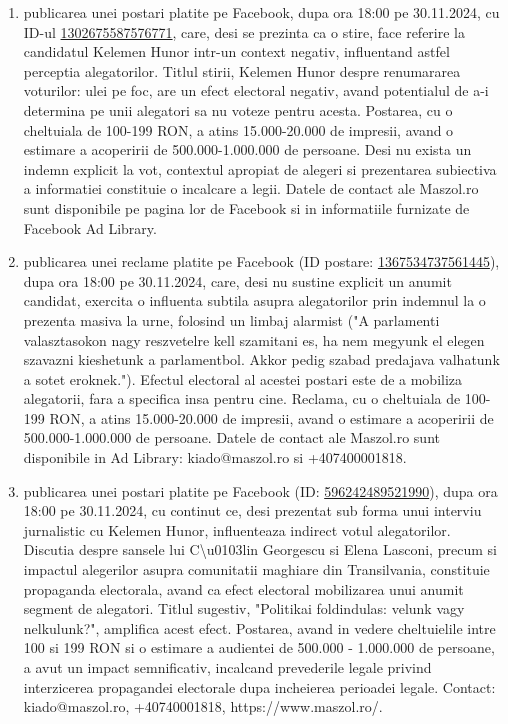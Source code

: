 \documentclass[a4paper,12pt]{article}
\begin{document}
\begin{enumerate}[leftmargin=*, label=\arabic*.)]
    \item publicarea unei postari platite pe Facebook, dupa ora 18:00 pe 30.11.2024, cu ID-ul \href{https://www.facebook.com/ads/library/?id=1302675587576771}{1302675587576771}, care, desi se prezinta ca o stire, face referire la candidatul Kelemen Hunor intr-un context negativ, influentand astfel perceptia alegatorilor.  Titlul stirii, Kelemen Hunor despre renumararea voturilor: ulei pe foc, are un efect electoral negativ, avand potentialul de a-i determina pe unii alegatori sa nu voteze pentru acesta.  Postarea, cu o cheltuiala de 100-199 RON, a atins 15.000-20.000 de impresii, avand o estimare a acoperirii de 500.000-1.000.000 de persoane.  Desi nu exista un indemn explicit la vot, contextul apropiat de alegeri si prezentarea subiectiva a informatiei constituie o incalcare a legii.  Datele de contact ale Maszol.ro sunt disponibile pe pagina lor de Facebook si in informatiile furnizate de Facebook Ad Library.
    \item publicarea unei reclame platite pe Facebook (ID postare: \href{https://www.facebook.com/ads/library/?id=1367534737561445}{1367534737561445}), dupa ora 18:00 pe 30.11.2024, care, desi nu sustine explicit un anumit candidat, exercita o influenta subtila asupra alegatorilor prin indemnul la o prezenta masiva la urne, folosind un limbaj alarmist ("A parlamenti valasztasokon nagy reszvetelre kell szamitani es, ha nem megyunk el elegen szavazni kieshetunk a parlamentbol. Akkor pedig szabad predajava valhatunk a sotet eroknek.").  Efectul electoral al acestei postari este de a mobiliza alegatorii, fara a specifica insa pentru cine.  Reclama, cu o cheltuiala de 100-199 RON, a atins 15.000-20.000 de impresii, avand o estimare a acoperirii de 500.000-1.000.000 de persoane.  Datele de contact ale Maszol.ro sunt disponibile in Ad Library: kiado@maszol.ro si +407400001818.
    \item publicarea unei postari platite pe Facebook (ID: \href{https://www.facebook.com/ads/library/?id=596242489521990}{596242489521990}), dupa ora 18:00 pe 30.11.2024, cu continut ce, desi prezentat sub forma unui interviu jurnalistic cu Kelemen Hunor, influenteaza indirect votul alegatorilor. Discutia despre sansele lui C\textbackslash{}u0103lin Georgescu si Elena Lasconi, precum si impactul alegerilor asupra comunitatii maghiare din Transilvania, constituie propaganda electorala, avand ca efect electoral mobilizarea unui anumit segment de alegatori. Titlul sugestiv, "Politikai foldindulas: velunk vagy nelkulunk?", amplifica acest efect.  Postarea, avand in vedere cheltuielile intre 100 si 199 RON si o estimare a audientei de 500.000 - 1.000.000 de persoane, a avut un impact semnificativ, incalcand prevederile legale privind interzicerea propagandei electorale dupa incheierea perioadei legale.  Contact: kiado@maszol.ro, +40740001818, https://www.maszol.ro/.
\end{enumerate}
\end{document}
